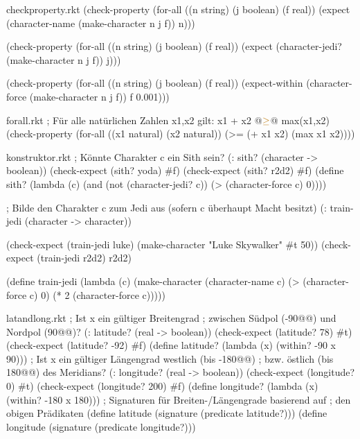 \begin{filecontents*}{checkproperty.rkt}
(check-property 
 (for-all ((n string)
           (j boolean)
           (f real))
   (expect (character-name (make-character n j f)) n)))

(check-property 
 (for-all ((n string)
           (j boolean)
           (f real))
   (expect (character-jedi? (make-character n j f)) j)))

(check-property 
 (for-all ((n string)
           (j boolean)
           (f real))
   (expect-within (character-force (make-character n j f)) f 0.001)))
\end{filecontents*}
\begin{filecontents*}{forall.rkt}
; Für alle natürlichen Zahlen x1,x2 gilt: x1 + x2 @$\textcolor{kommentar}{\geq}$@ max(x1,x2)
(check-property
 (for-all ((x1 natural)
           (x2 natural))
   (>= (+ x1 x2) (max x1 x2))))
\end{filecontents*}
\begin{filecontents*}{konstruktor.rkt}
; Könnte Charakter c ein Sith sein?
(: sith? (character -> boolean))
(check-expect (sith? yoda) #f)
(check-expect (sith? r2d2) #f)
(define sith?
  (lambda (c)
    (and (not (character-jedi? c))
         (> (character-force c) 0))))


; Bilde den Charakter c zum Jedi aus (sofern c überhaupt Macht besitzt)
(: train-jedi (character -> character))

(check-expect (train-jedi luke) (make-character "Luke Skywalker" #t 50))
(check-expect (train-jedi r2d2) r2d2)

(define train-jedi
  (lambda (c)
    (make-character (character-name c) 
                    (> (character-force c) 0)
                    (* 2 (character-force c)))))
\end{filecontents*}
\begin{filecontents*}{latandlong.rkt}
; Ist x ein gültiger Breitengrad 
; zwischen Südpol (-90@\latexcode{$^{\circ}$}@) und Nordpol (90@\latexcode{$^{\circ}$}@)?
(: latitude? (real -> boolean))
(check-expect (latitude? 78) #t)
(check-expect (latitude? -92) #f)
(define latitude?
  (lambda (x)
    (within? -90 x 90)))
; Ist x ein gültiger Längengrad westlich (bis -180@\latexcode{$^{\circ}$}@) 
; bzw. östlich (bis 180@\latexcode{$^{\circ}$}@) des Meridians?
(: longitude? (real -> boolean))
(check-expect (longitude? 0) #t)
(check-expect (longitude? 200) #f)
(define longitude?
  (lambda (x)
    (within? -180 x 180)))
; Signaturen für Breiten-/Längengrade basierend auf
; den obigen Prädikaten
(define latitude
  (signature (predicate latitude?)))
(define longitude
  (signature (predicate longitude?)))
\end{filecontents*}
